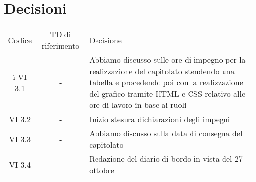 \section{Decisioni}

	\begin{table}[htbp]
		\begin{tabular}{|c|c|p{}|}
			\hline
			\rowcolor[gray]{0.9}
			Codice & TD di riferimento & Decisione \\ì
			\hline
			VI 3.1 & - & Abbiamo discusso sulle ore di impegno per la realizzazione del capitolato stendendo una tabella e procedendo poi con la realizzazione del grafico tramite HTML e CSS relativo alle ore di lavoro in base ai ruoli\\
			\hline
			VI 3.2 & - & Inizio stesura dichiarazioni degli impegni \\
			\hline
			VI 3.3 & - &  Abbiamo discusso sulla data di consegna del capitolato\\
			\hline
			VI 3.4 & - &  Redazione del diario di bordo in vista del 27 ottobre\\
			\hline
		\end{tabular}
	\end{table}